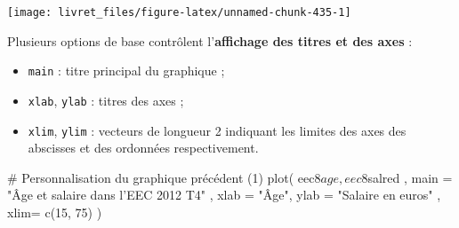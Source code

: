 \documentclass[12pt,twosided, notitlepage]{book}
\newenvironment{Shaded}{}{}
\newcommand{\KeywordTok}[1]{\textcolor[rgb]{0.00,0.00,1.00}{#1}}
\newcommand{\DataTypeTok}[1]{#1}
\newcommand{\DecValTok}[1]{#1}
\newcommand{\StringTok}[1]{\textcolor[rgb]{0.00,0.50,0.50}{#1}}
\newcommand{\CommentTok}[1]{\textcolor[rgb]{0.00,0.50,0.00}{#1}}
\newcommand{\OperatorTok}[1]{#1}
\newcommand{\NormalTok}[1]{#1}
\providecommand{\tightlist}{%
  \setlength{\itemsep}{0pt}\setlength{\parskip}{0pt}}
\renewenvironment{Shaded}{\begin{snugshade}}{\end{snugshade}}
\begin{document}
\begin{Shaded}
\end{Shaded}

\begin{center}\texttt{[image: livret\_files/figure-latex/unnamed-chunk-435-1]} \end{center}

Plusieurs options de base contrôlent l'\textbf{affichage des titres et
des axes} :

\begin{itemize}
\tightlist
\item
  \texttt{main} : titre principal du graphique ;
\item
  \texttt{xlab}, \texttt{ylab} : titres des axes ;
\item
  \texttt{xlim}, \texttt{ylim} : vecteurs de longueur 2 indiquant les
  limites des axes des abscisses et des ordonnées respectivement.
\end{itemize}

\begin{Shaded}
\begin{Highlighting}[]
\CommentTok{# Personnalisation du graphique précédent (1)}
\KeywordTok{plot}\NormalTok{(}
\NormalTok{  eec8}\OperatorTok{$}\NormalTok{age, eec8}\OperatorTok{$}\NormalTok{salred}
\NormalTok{  , }\DataTypeTok{main =} \StringTok{"Âge et salaire dans l'EEC 2012 T4"}
\NormalTok{  , }\DataTypeTok{xlab =} \StringTok{"Âge"}\NormalTok{, }\DataTypeTok{ylab =} \StringTok{"Salaire en euros"}
\NormalTok{  , }\DataTypeTok{xlim=} \KeywordTok{c}\NormalTok{(}\DecValTok{15}\NormalTok{, }\DecValTok{75}\NormalTok{)}
\NormalTok{)}
\end{Highlighting}
\end{Shaded}
\end{document}
